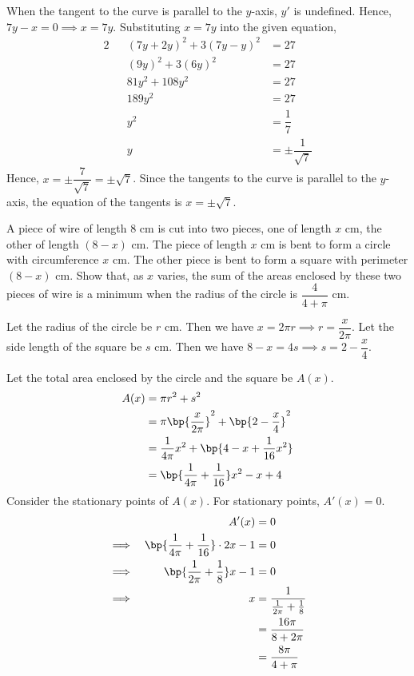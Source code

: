 \documentclass{echw}
\begin{document}

            \subpart
                When the tangent to the curve is parallel to the $y$-axis, $y'$ is undefined. Hence, $7y-x =0 \implies x = 7y$. Substituting $x = 7y$ into the given equation,
                \begin{alignat*}{2}
                    &&(7y+2y)^2 + 3(7y-y)^2 &= 27\\
                    &&(9y)^2 + 3(6y)^2 &= 27\\
                    &&81y^2 + 108y^2 &= 27\\
                    &&189y^2 &= 27\\
                    &&y^2 &= \dfrac17\\
                    &&y &= \pm \dfrac1{\sqrt7}
                \end{alignat*}
                Hence, $x = \pm \dfrac{7}{\sqrt7} = \pm \sqrt7$. Since the tangents to the curve is parallel to the $y$-axis, the equation of the tangents is $x = \pm \sqrt7$.


    \problem{}
        A piece of wire of length 8 cm is cut into two pieces, one of length $x$ cm, the other of length $(8-x)$ cm. The piece of length $x$ cm is bent to form a circle with circumference $x$ cm. The other piece is bent to form a square with perimeter $(8-x)$ cm. Show that, as $x$ varies, the sum of the areas enclosed by these two pieces of wire is a minimum when the radius of the circle is $\dfrac4{4+\pi}$ cm.

    \solution
        Let the radius of the circle be $r$ cm. Then we have $x = 2\pi r \implies r = \dfrac{x}{2\pi}$. Let the side length of the square be $s$ cm. Then we have $8-x=4s \implies s = 2-\dfrac{x}4$.

        Let the total area enclosed by the circle and the square be $A(x)$.
        \begin{align*}
            A(x) &= \pi r^2 + s^2\\
            &= \pi \bp{\dfrac{x}{2\pi}}^2 + \bp{2-\dfrac{x}4}^2\\
            &= \dfrac1{4\pi}x^2 + \bp{4 - x + \dfrac1{16}x^2}\\
            &= \bp{\dfrac1{4\pi} + \dfrac1{16}}x^2 - x + 4
        \end{align*}
        Consider the stationary points of $A(x)$. For stationary points, $A'(x) = 0$.
        \begin{alignat*}{2}
            &&A'(x) &= 0\\
            \implies&&\bp{\dfrac1{4\pi} + \dfrac1{16}}\cdot 2x - 1 &= 0\\
            \implies&&\bp{\dfrac1{2\pi} + \dfrac1{8}}x - 1 &= 0\\
            \implies&& x &= \dfrac1{\tfrac1{2\pi} + \tfrac1{8}}\\
            && &= \dfrac{16\pi}{8 + 2\pi}\\
            && &=\dfrac{8\pi}{4 + \pi}
        \end{alignat*}
\end{document}
